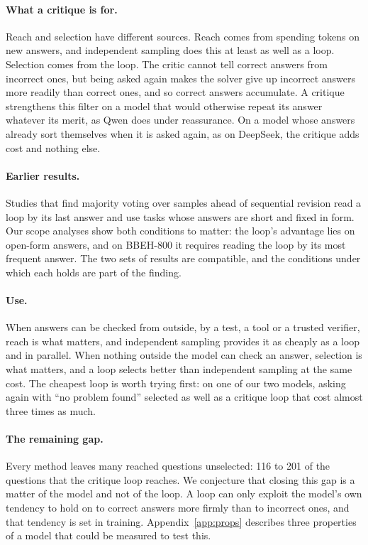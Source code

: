 \documentclass[11pt]{article}
\newcommand{\ds}{DeepSeek}
\newcommand{\qw}{Qwen}
\begin{document}
\paragraph{What a critique is for.}
Reach and selection have different sources.
Reach comes from spending tokens on new answers, and independent sampling does this at least as well as a loop.
Selection comes from the loop.
The critic cannot tell correct answers from incorrect ones, but being asked again makes the solver give up incorrect answers more readily than correct ones, and so correct answers accumulate.
A critique strengthens this filter on a model that would otherwise repeat its answer whatever its merit, as \qw{} does under reassurance.
On a model whose answers already sort themselves when it is asked again, as on \ds, the critique adds cost and nothing else.

\paragraph{Earlier results.}
Studies that find majority voting over samples ahead of sequential revision \citep{wang2025rethinking,mirzaei2026sample} read a loop by its last answer and use tasks whose answers are short and fixed in form.
Our scope analyses show both conditions to matter: the loop's advantage lies on open-form answers, and on BBEH-800 it requires reading the loop by its most frequent answer.
The two sets of results are compatible, and the conditions under which each holds are part of the finding.

\paragraph{Use.}
When answers can be checked from outside, by a test, a tool or a trusted verifier, reach is what matters, and independent sampling provides it as cheaply as a loop and in parallel.
When nothing outside the model can check an answer, selection is what matters, and a loop selects better than independent sampling at the same cost.
The cheapest loop is worth trying first: on one of our two models, asking again with ``no problem found'' selected as well as a critique loop that cost almost three times as much.

\paragraph{The remaining gap.}
Every method leaves many reached questions unselected: 116 to 201 of the questions that the critique loop reaches.
We conjecture that closing this gap is a matter of the model and not of the loop. A loop can only exploit the model's own tendency to hold on to correct answers more firmly than to incorrect ones, and that tendency is set in training.
Appendix~\ref{app:props} describes three properties of a model that could be measured to test this.
\end{document}
